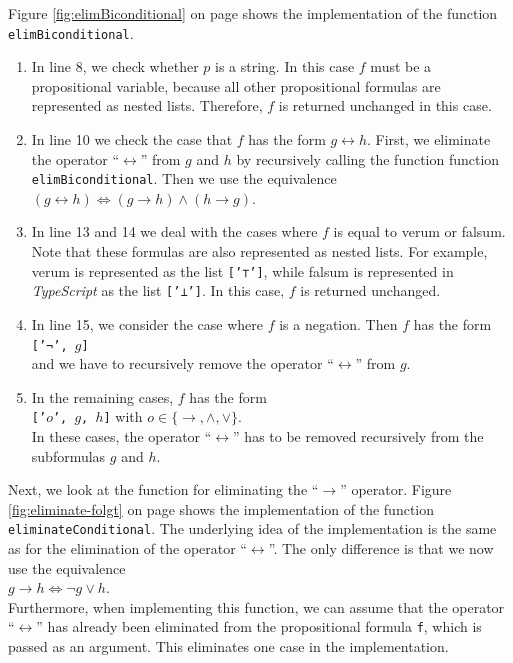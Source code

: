 Figure \ref{fig:elimBiconditional} on page \pageref{fig:elimBiconditional} shows the implementation of the
function \texttt{elimBiconditional}.
\begin{enumerate}
\item In line 8, we check whether $p$ is a string.  In this case
      $f$ must be a propositional variable, because all other propositional formulas are represented as nested lists.
      Therefore, $f$ is returned unchanged in this case.
\item In line 10 we check the case that $f$ has the form $g \leftrightarrow h$.
      First, we eliminate the operator ``$\leftrightarrow$'' from $g$ and $h$ by recursively
      calling the function function \texttt{elimBiconditional}.  Then we use the equivalence
      \\[0.2cm]
      \hspace*{1.3cm}
      $(g \leftrightarrow h) \Leftrightarrow (g \rightarrow h) \wedge (h \rightarrow g)$.
\item In line 13 and 14 we deal with the cases where $f$ is equal to verum or falsum.
      Note that these formulas are also represented as nested lists.
      For example, verum is represented as the list \texttt{['⊤']}, while falsum is represented in
      \textsl{TypeScript} as the list \texttt{['⊥']}.  In this case, $f$
      is returned unchanged.
\item In line 15, we consider the case where $f$ is a negation.  Then $f$ has the form
      \\[0.2cm]
      \hspace*{1.3cm}
      \texttt{['¬', $g$]}  
      \\[0.2cm]
      and we have to recursively remove the operator ``$\leftrightarrow$'' from $g$.
\item In the remaining cases, $f$ has the form
      \\[0.2cm]
      \hspace*{1.3cm}
      \texttt{['$o$', $g$, $h$]}  \quad with $o \in \{\rightarrow, \wedge, \vee\}$.
      \\[0.2cm]
      In these cases, the operator ``$\leftrightarrow$'' has to be removed recursively from the subformulas $g$ and $h$. 
\end{enumerate}
\FloatBarrier

Next, we look at the function for eliminating the ``$\rightarrow$'' operator. 
Figure
\ref{fig:eliminate-folgt} on page \pageref{fig:eliminate-folgt} shows the
implementation of the function
\texttt{eliminateConditional}.
The underlying idea of the implementation is the same as for the elimination of the
operator ``$\leftrightarrow$''.  The only difference is that we now use the
equivalence \\[0.2cm]
\hspace*{1.3cm}
$g \rightarrow h \Leftrightarrow \neg g \vee h$. \\[0.2cm]
Furthermore, when implementing this function, we can assume that the operator ``$\leftrightarrow$''
has already been eliminated from the propositional formula \texttt{f}, which is passed as an argument.
This eliminates one case in the implementation. 



